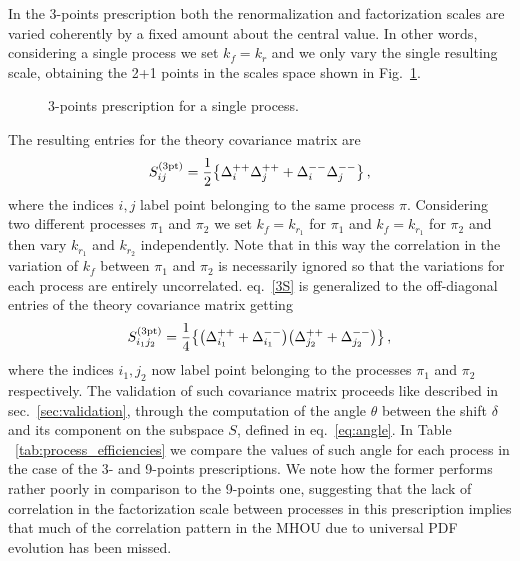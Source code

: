%
In the 3-points prescription both the renormalization and factorization scales are varied coherently by a fixed amount about the
central value.
In other words, considering a single process we set $k_f=k_r$ and we only vary the single resulting scale, obtaining the
2+1 points in the scales space shown in Fig.~\ref{fig:3-points}.
\begin{figure}[t]
    \centering
    {}\qquad
    \begin{caption}{3-points prescription for a single process.}
      \label{fig:3-points}
    \end{caption}
\end{figure}
The resulting entries for the theory covariance matrix are 
\begin{align}
    \label{3S}
    S^{(\rm 3pt)}_{ij} = \frac{1}{2}\big\{ \Delta_i^{++}\Delta_j^{++}  + \Delta_i^{--}\Delta_j^{--}\big\} \, ,
\end{align}
where the indices $i,j$ label point belonging to the same process $\pi$.
Considering two different processes $\pi_1$ and $\pi_2$ we set $k_f=k_{r_1}$ for $\pi_1$ and $k_f=k_{r_1}$ for $\pi_2$
and then vary $k_{r_1}$ and $k_{r_2}$ independently. Note that in this way the correlation in the variation of $k_f$
between $\pi_1$ and $\pi_2$ is necessarily ignored so that the variations for each process are entirely uncorrelated.
eq.~\eqref{3S} is generalized to the off-diagonal entries of the theory covariance matrix getting
\begin{equation}
    S^{(\rm 3pt)}_{i_1j_2} = 
    \frac{1}{4}\big\{\big(\Delta_{i_1}^{++} + \Delta_{i_1}^{--} \big) \big(\Delta_{j_2}^{++} + \Delta_{j_2}^{--} \big) \big\}\, ,
\end{equation}
where the indices $i_1,j_2$ now label point belonging to the processes $\pi_1$ and $\pi_2$ respectively.
The validation of such covariance matrix proceeds like described in sec.~\ref{sec:validation},
through the computation of the angle $\theta$ between the shift $\delta$ and its component on the
subspace $S$, defined in eq.~\eqref{eq:angle}. In Table ~\ref{tab:process_efficiencies} 
we compare the values of such angle for each process in the case of the 3- and 9-points prescriptions.
We note how the former performs rather poorly in comparison to the 9-points one,
suggesting that the lack of correlation in the factorization scale between processes in this prescription
implies that much of the correlation pattern in the MHOU due to universal PDF evolution has been missed.
\begin{table}[ht!]
	\centering
	\small
	
        \vspace{3mm}
	\caption{Comparison between the $\theta$ values for the 3- and 9-points prescriptions.}
	\label{tab:process_efficiencies}
\end{table}


